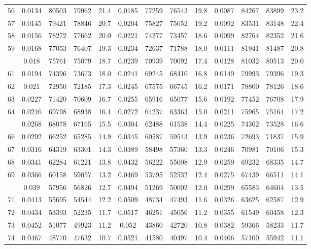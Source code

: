 \documentclass[
  14pt,
]{article}
\begin{document}
\begin{longtable}[t]{lcccccccccccc}
56 & 0.0134 & 80503 & 79962 & 21.4 & 0.0185 & 77259 & 76543 & 19.8 & 0.0087 & 84267 & 83899 & 23.2\\
57 & 0.0145 & 79421 & 78846 & 20.7 & 0.0204 & 75827 & 75052 & 19.2 & 0.0092 & 83531 & 83148 & 22.4\\
58 & 0.0156 & 78272 & 77662 & 20.0 & 0.0221 & 74277 & 73457 & 18.6 & 0.0099 & 82764 & 82352 & 21.6\\
59 & 0.0168 & 77053 & 76407 & 19.3 & 0.0234 & 72637 & 71788 & 18.0 & 0.0111 & 81941 & 81487 & 20.8\\
\addlinespace
60 & 0.018 & 75761 & 75079 & 18.7 & 0.0239 & 70939 & 70092 & 17.4 & 0.0128 & 81032 & 80513 & 20.0\\
61 & 0.0194 & 74396 & 73673 & 18.0 & 0.0241 & 69245 & 68410 & 16.8 & 0.0149 & 79993 & 79396 & 19.3\\
62 & 0.021 & 72950 & 72185 & 17.3 & 0.0245 & 67575 & 66745 & 16.2 & 0.0171 & 78800 & 78126 & 18.6\\
63 & 0.0227 & 71420 & 70609 & 16.7 & 0.0255 & 65916 & 65077 & 15.6 & 0.0192 & 77452 & 76708 & 17.9\\
64 & 0.0246 & 69798 & 68938 & 16.1 & 0.0272 & 64237 & 63363 & 15.0 & 0.0211 & 75965 & 75164 & 17.2\\
\addlinespace
65 & 0.0268 & 68078 & 67165 & 15.5 & 0.0304 & 62488 & 61538 & 14.4 & 0.0225 & 74362 & 73528 & 16.6\\
66 & 0.0292 & 66252 & 65285 & 14.9 & 0.0345 & 60587 & 59543 & 13.9 & 0.0236 & 72693 & 71837 & 15.9\\
67 & 0.0316 & 64319 & 63301 & 14.3 & 0.0389 & 58498 & 57360 & 13.3 & 0.0246 & 70981 & 70106 & 15.3\\
68 & 0.0341 & 62284 & 61221 & 13.8 & 0.0432 & 56222 & 55008 & 12.9 & 0.0259 & 69232 & 68335 & 14.7\\
69 & 0.0366 & 60158 & 59057 & 13.2 & 0.0469 & 53795 & 52532 & 12.4 & 0.0275 & 67439 & 66511 & 14.1\\
\addlinespace
70 & 0.039 & 57956 & 56826 & 12.7 & 0.0494 & 51269 & 50002 & 12.0 & 0.0299 & 65583 & 64604 & 13.5\\
71 & 0.0413 & 55695 & 54544 & 12.2 & 0.0509 & 48734 & 47493 & 11.6 & 0.0326 & 63625 & 62587 & 12.9\\
72 & 0.0434 & 53393 & 52235 & 11.7 & 0.0517 & 46251 & 45056 & 11.2 & 0.0355 & 61549 & 60458 & 12.3\\
73 & 0.0452 & 51077 & 49923 & 11.2 & 0.052 & 43860 & 42720 & 10.8 & 0.0382 & 59366 & 58233 & 11.7\\
74 & 0.0467 & 48770 & 47632 & 10.7 & 0.0521 & 41580 & 40497 & 10.4 & 0.0406 & 57100 & 55942 & 11.1\\

\end{longtable}
\end{document}
